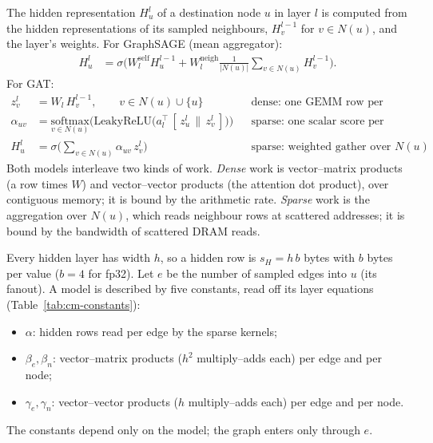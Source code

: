 The hidden representation $H^{l}_u$ of a destination node $u$ in layer $l$ is computed from the
hidden representations of its sampled neighbours, $H^{l-1}_v$ for $v \in N(u)$, and the layer's
weights. For GraphSAGE (mean aggregator):
\begin{align}
  H^{l}_u &= \sigma\Big( W^{\mathrm{self}}_l H^{l-1}_u
      + W^{\mathrm{neigh}}_l \tfrac{1}{|N(u)|}\textstyle\sum_{v \in N(u)} H^{l-1}_v \Big).
      \label{eq:sage}
\end{align}
For GAT:
\begin{align}
   z^{l}_v &= W_l\, H^{l-1}_v,
      \qquad v \in N(u) \cup \{u\}
      && \text{dense: one GEMM row per source node} \label{eq:gat-dense}\\
   \alpha_{uv} &= \underset{v \in N(u)}{\mathrm{softmax}}\Big(
         \mathrm{LeakyReLU}\big(a_l^{\top}\,[\, z^{l}_u \,\|\, z^{l}_v \,]\big)\Big)
      && \text{sparse: one scalar score per edge} \label{eq:gat-attn}\\
   H^{l}_u &= \sigma\Big( \sum_{v \in N(u)} \alpha_{uv}\, z^{l}_v \Big)
      && \text{sparse: weighted gather over } N(u) \label{eq:gat-agg}
\end{align}
Both models interleave two kinds of work. \emph{Dense} work is vector--matrix products
(a row times $W$) and vector--vector products (the attention dot product), over contiguous
memory; it is bound by the arithmetic rate. \emph{Sparse} work is the aggregation over $N(u)$,
which reads neighbour rows at scattered addresses; it is bound by the bandwidth of scattered
DRAM reads.

Every hidden layer has width $h$, so a hidden row is $s_H = h\,b$ bytes with $b$ bytes per value
($b{=}4$ for fp32). Let $e$ be the number of sampled edges into $u$ (its fanout). A model is
described by five constants, read off its layer equations (Table~\ref{tab:cm-constants}):
\begin{itemize}\itemsep1pt
  \item $\alpha$: hidden rows read per edge by the sparse kernels;
  \item $\beta_e, \beta_n$: vector--matrix products ($h^2$ multiply--adds each) per edge and per node;
  \item $\gamma_e, \gamma_n$: vector--vector products ($h$ multiply--adds each) per edge and per node.
\end{itemize}
The constants depend only on the model; the graph enters only through $e$.

